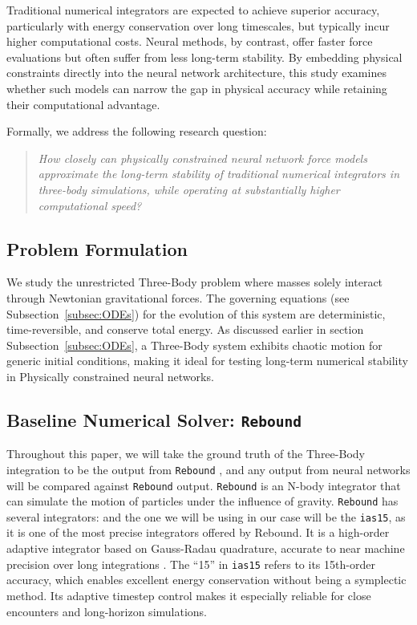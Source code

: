 \documentclass[12pt]{article}
\begin{document}
Traditional numerical integrators are expected to achieve superior accuracy, particularly with energy conservation over long timescales, but typically incur higher computational costs. Neural methods, by contrast, offer faster force evaluations but often suffer from less long-term stability. By embedding physical constraints directly into the neural network architecture, this study examines whether such models can narrow the gap in physical accuracy while retaining their computational advantage.

Formally, we address the following research question:
\begin{quote}
\emph{How closely can physically constrained neural network force models approximate the long-term stability of traditional numerical integrators in three-body simulations, while operating at substantially higher computational speed?}
\end{quote}

\subsection{Problem Formulation}
We study the unrestricted Three-Body problem where masses solely interact through Newtonian gravitational forces. The governing equations (see Subsection~\ref{subsec:ODEs}) for the evolution of this system are deterministic, time-reversible, and conserve total energy. As discussed earlier in section Subsection~\ref{subsec:ODEs}, a Three-Body system exhibits chaotic motion for generic initial conditions, making it ideal for testing long-term numerical stability in Physically constrained neural networks.

\subsection{Baseline Numerical Solver: \texttt{Rebound}}
Throughout this paper, we will take the ground truth of the Three-Body integration to be the output from \texttt{Rebound} \citep{Rein2012}, and any output from neural networks will be compared against \texttt{Rebound} output. \texttt{Rebound} is an N-body integrator that can simulate the motion of particles under the influence of gravity. \texttt{Rebound} has several integrators: and the one we will be using in our case will be the \texttt{ias15}, \cite{Rein_2014} as it is one of the most precise integrators offered by Rebound. It is a high-order adaptive integrator based on Gauss-Radau quadrature, accurate to near machine precision over long integrations \citep{Rein_2014}. The ``15'' in \texttt{ias15} refers to its 15th-order accuracy, which enables excellent energy conservation without being a symplectic method. Its adaptive timestep control makes it especially reliable for close encounters and long-horizon simulations.
\end{document}
